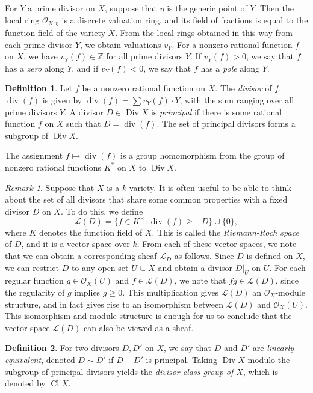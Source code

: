 \documentclass[12pt,twoside]{reedthesis}
\theoremstyle{plain}
\theoremstyle{definition}
\newtheorem{definition}{Definition}[section]
\theoremstyle{remark}
\newtheorem{remark}{Remark}[section]
\newcommand{\ZZ}{\mathbb{Z}}
\newcommand{\calO}{\mathcal{O}}
\newcommand{\Div}{\operatorname{Div}}
\newcommand{\Cl}{\operatorname{Cl}}
\renewcommand{\div}{\operatorname{div}}
\begin{document}
For $Y$ a prime divisor on $X$, suppose that $\eta$ is the generic point of $Y$. Then the local ring $\calO_{X,\eta}$ is a discrete valuation ring, and its field of fractions is equal to the function field of the variety $X$. From the local rings obtained in this way from each prime divisor $Y$, we obtain valuations $v_Y$. For a nonzero rational function $f$ on $X$, we have $v_Y(f)\in\ZZ$ for all prime divisors $Y$. If $v_Y(f)>0$, we say that $f$ has a \emph{zero} along $Y$, and if $v_Y(f)<0$, we say that $f$ has a \emph{pole} along $Y$.

\begin{definition}
Let $f$ be a nonzero rational function on $X$. The \emph{divisor} of $f$, $\div(f)$ is given by $\div(f)=\sum v_Y(f)\cdot Y$, with the sum ranging over all prime divisors $Y$. A divisor $D\in\Div X$ is \emph{principal} if there is some rational function $f$ on $X$ such that $D=\div(f)$. The set of principal divisors forms a subgroup of $\Div X$.
\end{definition}

\noindent The assignment $f\mapsto\div(f)$ is a group homomorphism from the group of nonzero rational functions $K^*$ on $X$ to $\Div X$. 

\begin{remark}\label{divSpace}
Suppose that $X$ is a $k$-variety. It is often useful to be able to think about the set of all divisors that share some common properties with a fixed divisor $D$ on $X$. To do this, we define \[\mathcal{L}(D)=\{f\in K^\times: \div(f)\geq -D\}\cup\{0\},\] where $K$ denotes the function field of $X$. This is called the \emph{Riemann-Roch space} of $D$, and it is a vector space over $k$. From each of these vector spaces, we note that we can obtain a corresponding sheaf $\mathcal{L}_D$ as follows. Since $D$ is defined on $X$, we can restrict $D$ to any open set $U\subseteq X$ and obtain a divisor $D|_U$ on $U$. For each regular function $g\in\calO_X(U)$ and $f\in\mathcal{L}(D)$, we note that $fg\in\mathcal{L}(D)$, since the regularity of $g$ implies $g\geq0$. This multiplication gives $\mathcal{L}(D)$ an  $\calO_X$-module structure, and in fact gives rise to an isomorphism between $\mathcal{L}(D)$ and $\calO_X(U)$. This isomorphism and module structure is enough for us to conclude that the vector space $\mathcal{L}(D)$ can also be viewed as a sheaf.
\end{remark}

\begin{definition}
For two divisors $D,D'$ on $X$, we say that $D$ and $D'$ are \emph{linearly equivalent}, denoted $D\sim D'$ if $D-D'$ is principal. Taking $\Div X$ modulo the subgroup of principal divisors yields the \emph{divisor class group of $X$}, which is denoted by $\Cl X$.
\end{definition}
\end{document}
